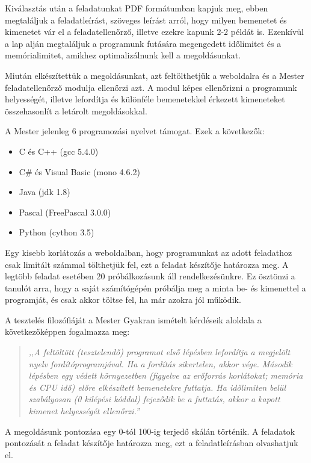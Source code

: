 Kiválasztás után a feladatunkat PDF formátumban kapjuk meg, ebben megtaláljuk a feladatleírást, szöveges leírást arról, hogy milyen bemenetet és kimenetet vár el a feladatellenőrző, illetve ezekre kapunk 2-2 példát is. Ezenkívül a lap alján megtaláljuk a programunk futására megengedett időlimitet és a memórialimitet, amikhez optimalizálnunk kell a megoldásunkat.

Miután elkészítettük a megoldásunkat, azt feltölthetjük a weboldalra és a Mester feladatellenőrző modulja ellenőrzi azt. A modul képes ellenőrizni a programunk helyességét, illetve lefordítja és különféle bemenetekkel érkezett kimeneteket összehasonlít a letárolt megoldásokkal.

A Mester jelenleg 6 programozási nyelvet támogat. Ezek a következők: \cite{elte-mester_tudnivalok}
\begin{itemize}
    \item C és C++ (gcc 5.4.0)
    \item C\# és Visual Basic (mono 4.6.2)
    \item Java (jdk 1.8)
    \item Pascal (FreePascal 3.0.0)
    \item Python (cython 3.5)
\end{itemize}

Egy kisebb korlátozás a weboldalban, hogy programunkat az adott feladathoz csak limitált számmal tölthetjük fel, ezt a feladat készítője határozza meg. A legtöbb feladat esetében 20 próbálkozásunk áll rendelkezésünkre. Ez ösztönzi a tanulót arra, hogy a saját számítógépén próbálja meg a minta be- és kimenettel a programját, és csak akkor töltse fel, ha már azokra jól működik.

A tesztelés filozófiáját a Mester Gyakran ismételt kérdéseik aloldala a következőképpen fogalmazza meg:
\begin{quotation}
    \textsl{,,A feltöltött (tesztelendő) programot első lépésben lefordítja a megjelölt nyelv fordítóprogramjával. Ha a fordítás sikertelen, akkor vége. Második lépésben egy védett környezetben (figyelve az erőforrás korlátokat; memória és CPU idő) előre elkészített bemenetekre futtatja. Ha időlimiten belül szabályosan (0 kilépési kóddal) fejeződik be a futtatás, akkor a kapott kimenet helyességét ellenőrzi.''} \cite{elte-mester_gyik}
\end{quotation}
A megoldásunk pontozása egy 0-tól 100-ig terjedő skálán történik. A feladatok pontozását a feladat készítője határozza meg, ezt a feladatleírásban olvashatjuk el.

